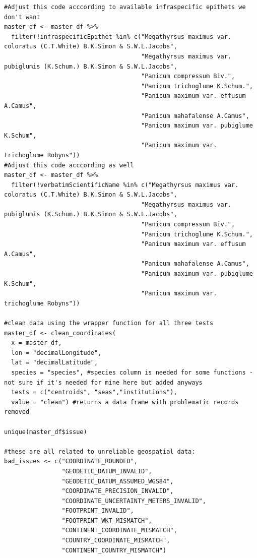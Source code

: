 \documentclass[
]{article}
\begin{document}
\begin{verbatim}
#Adjust this code acccording to available infraspecific epithets we don't want
master_df <- master_df %>%
  filter(!infraspecificEpithet %in% c("Megathyrsus maximus var. coloratus (C.T.White) B.K.Simon & S.W.L.Jacobs",
                                      "Megathyrsus maximus var. pubiglumis (K.Schum.) B.K.Simon & S.W.L.Jacobs",
                                      "Panicum compressum Biv.",
                                      "Panicum trichoglume K.Schum.",
                                      "Panicum maximum var. effusum A.Camus",
                                      "Panicum mahafalense A.Camus",
                                      "Panicum maximum var. pubiglume K.Schum",
                                      "Panicum maximum var. trichoglume Robyns"))
#Adjust this code acccording as well
master_df <- master_df %>%
  filter(!verbatimScientificName %in% c("Megathyrsus maximus var. coloratus (C.T.White) B.K.Simon & S.W.L.Jacobs",
                                      "Megathyrsus maximus var. pubiglumis (K.Schum.) B.K.Simon & S.W.L.Jacobs",
                                      "Panicum compressum Biv.",
                                      "Panicum trichoglume K.Schum.",
                                      "Panicum maximum var. effusum A.Camus",
                                      "Panicum mahafalense A.Camus",
                                      "Panicum maximum var. pubiglume K.Schum",
                                      "Panicum maximum var. trichoglume Robyns"))

#clean data using the wrapper function for all three tests
master_df <- clean_coordinates(
  x = master_df,
  lon = "decimalLongitude",
  lat = "decimalLatitude",
  species = "species", #species column is needed for some functions - not sure if it's needed for mine here but added anyways
  tests = c("centroids", "seas","institutions"),
  value = "clean") #returns a data frame with problematic records removed

unique(master_df$issue)

#these are all related to unreliable geospatial data:
bad_issues <- c("COORDINATE_ROUNDED",
                "GEODETIC_DATUM_INVALID",
                "GEODETIC_DATUM_ASSUMED_WGS84",
                "COORDINATE_PRECISION_INVALID",
                "COORDINATE_UNCERTAINTY_METERS_INVALID",
                "FOOTPRINT_INVALID",
                "FOOTPRINT_WKT_MISMATCH",
                "CONTINENT_COORDINATE_MISMATCH",
                "COUNTRY_COORDINATE_MISMATCH",
                "CONTINENT_COUNTRY_MISMATCH")


\end{verbatim}
\end{document}
